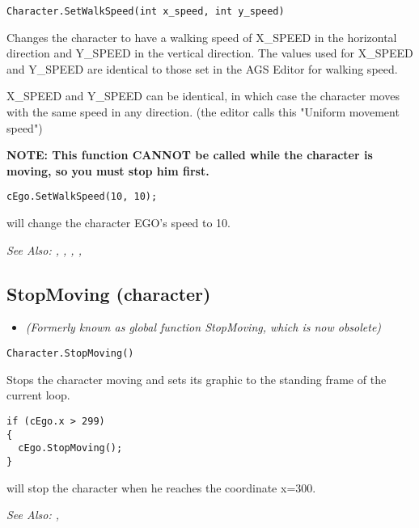 \begin{verbatim}
Character.SetWalkSpeed(int x_speed, int y_speed)
\end{verbatim}

Changes the character to have a walking speed of X_SPEED in the horizontal direction
and Y_SPEED in the vertical direction. The values used for X_SPEED and Y_SPEED are
identical to those set in the AGS Editor for walking speed.

X_SPEED and Y_SPEED can be identical, in which case the character moves with the same
speed in any direction. (the editor calls this "Uniform movement speed")

\bf{NOTE:} This function CANNOT be called while the character is moving, so
you must stop him first.

\begin{verbatim}
cEgo.SetWalkSpeed(10, 10);
\end{verbatim}
will change the character EGO's speed to 10.

\it{See Also:} ,
,
,
,



\subsection{StopMoving (character)}\label{Character.StopMoving}%

\begin{itemize}
\item \it{(Formerly known as global function StopMoving, which is now obsolete)}
\end{itemize}

\begin{verbatim}
Character.StopMoving()
\end{verbatim}
Stops the character moving and sets its graphic to the standing frame of the current loop.

\begin{verbatim}
if (cEgo.x > 299)
{
  cEgo.StopMoving();
}
\end{verbatim}
will stop the character when he reaches the coordinate x=300.

\it{See Also:} , 


